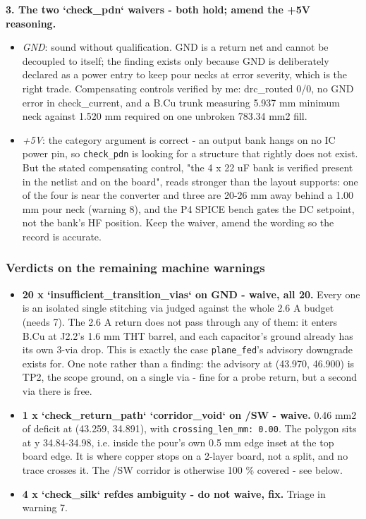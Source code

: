 \documentclass[11pt,a4paper]{article}
\begin{document}
\textbf{3. The two `check\_pdn` waivers - both hold; amend the +5V reasoning.}

\begin{itemize}
\item \emph{GND}: sound without qualification. GND is a return net and cannot be decoupled to
itself; the finding exists only because GND is deliberately declared as a power
entry to keep pour necks at error severity, which is the right trade. Compensating
controls verified by me: drc\_routed 0/0, no GND error in check\_current, and a B.Cu
trunk measuring 5.937 mm minimum neck against 1.520 mm required on one unbroken
783.34 mm2 fill.
\item \emph{+5V}: the category argument is correct - an output bank hangs on no IC power pin,
so \texttt{check\_pdn} is looking for a structure that rightly does not exist. But the stated
compensating control, "the 4 x 22 uF bank is verified present in the netlist and on
the board", reads stronger than the layout supports: one of the four is near the
converter and three are 20-26 mm away behind a 1.00 mm pour neck (warning 8), and
the P4 SPICE bench gates the DC setpoint, not the bank's HF position. Keep the
waiver, amend the wording so the record is accurate.
\end{itemize}
\subsubsection*{Verdicts on the remaining machine warnings}
\begin{itemize}
\item \textbf{20 x `insufficient\_transition\_vias` on GND - waive, all 20.} Every one is an
isolated single stitching via judged against the whole 2.6 A budget (needs 7). The
2.6 A return does not pass through any of them: it enters B.Cu at J2.2's 1.6 mm THT
barrel, and each capacitor's ground already has its own 3-via drop. This is exactly
the case \texttt{plane\_fed}'s advisory downgrade exists for. One note rather than a finding:
the advisory at (43.970, 46.900) is TP2, the scope ground, on a single via - fine for
a probe return, but a second via there is free.
\item \textbf{1 x `check\_return\_path` `corridor\_void` on /SW - waive.} 0.46 mm2 of deficit at
(43.259, 34.891), with \texttt{crossing\_len\_mm: 0.00}. The polygon sits at y 34.84-34.98,
i.e. inside the pour's own 0.5 mm edge inset at the top board edge. It is where
copper stops on a 2-layer board, not a split, and no trace crosses it. The /SW
corridor is otherwise 100 \% covered - see below.
\item \textbf{4 x `check\_silk` refdes ambiguity - do not waive, fix.} Triage in warning 7.
\end{itemize}
\end{document}
